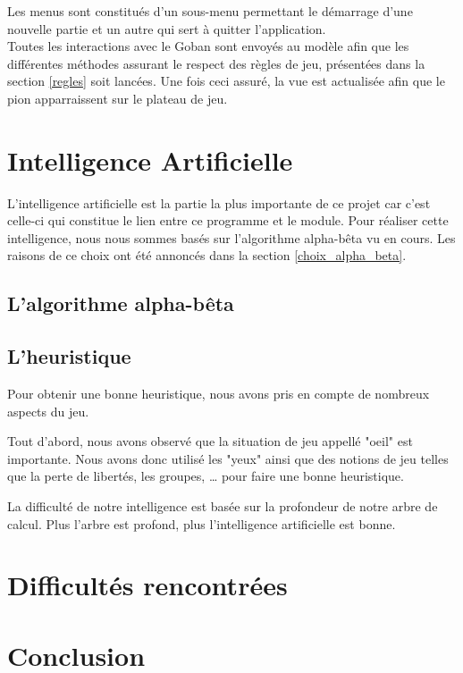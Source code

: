 \documentclass[11pt,a4paper]{article}
\begin{document}
Les menus sont constitués d'un sous-menu permettant le démarrage d'une nouvelle
partie et un autre qui sert à quitter l'application.\\

Toutes les interactions avec le Goban sont envoyés au modèle afin que les
différentes méthodes assurant le respect des règles de jeu, présentées dans la
section \ref{regles} soit lancées. Une fois ceci assuré, la vue est
actualisée afin que le pion apparraissent sur le plateau de jeu.
\clearpage
\section{Intelligence Artificielle}
L'intelligence artificielle est la partie la plus importante de ce projet car
c'est celle-ci qui constitue le lien entre ce programme et le module.
Pour réaliser cette intelligence, nous nous sommes basés sur l'algorithme
alpha-bêta vu en cours. Les raisons de ce choix ont été annoncés dans la
section \ref{choix_alpha_beta}.

\subsection{L'algorithme alpha-bêta}

\subsection{L'heuristique}
Pour obtenir une bonne heuristique, nous avons pris en compte de nombreux
aspects du jeu. 

Tout d'abord, nous avons observé que la situation de jeu
appellé "oeil" est importante.
Nous avons donc utilisé les "yeux" ainsi que des notions de jeu telles que la
perte de libertés, les groupes, \dots{} pour faire une bonne heuristique.

La difficulté de notre intelligence est basée sur la profondeur de notre arbre
de calcul. Plus l'arbre est profond, plus l'intelligence artificielle est bonne.

\clearpage
\section{Difficultés rencontrées}

\clearpage
\section{Conclusion}
\end{document}
